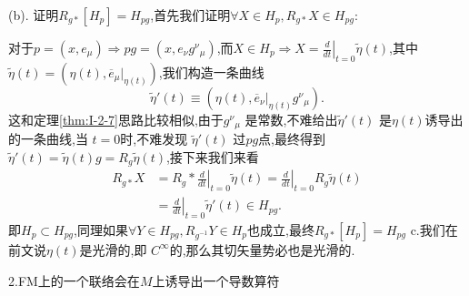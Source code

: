 \documentclass[../main.tex]{subfiles}
\begin{document}
{\color{red}(b).} 证明$R_{g*}[H_p] = H_{pg}$,首先我们证明$\forall X \in H_{p},R_{g*}X \in H_{pg}$:

对于$p = (x, e_\mu) \Rightarrow pg = (x, e_\nu g ^{\nu}{}_{\mu})$,而$X \in H_p \Rightarrow X = \left. \frac{d}{dt} \right|_{t = 0}\tilde{\eta}(t) $,其中$\tilde{\eta}(t) = (\eta(t),\overline{e}_\mu|_{\eta(t)})$,我们构造一条曲线\[\tilde{\eta}'(t)\equiv (\eta(t), \overline{e}_\nu|_{\eta(t)} g^{\nu}{}_{\mu}).\]
  这和定理\ref{thm:I-2-7}思路比较相似,由于$g^{\nu}{}_{\mu}$ 是常数,不难给出$\tilde{\eta}'(t)$ 是$\eta(t)$诱导出的一条曲线,当 $t = 0$时,不难发现 $\tilde{\eta}'(t)$ 过$pg$点,最终得到$\tilde{\eta}'(t) = \tilde{\eta}(t)g = R_g \tilde{\eta}(t)$,接下来我们来看
  \begin{align*}
    R_{g*} X &= R_g{*} \left. \frac{d}{dt} \right|_{t = 0}\tilde{\eta}(t) =  \left. \frac{d}{dt} \right|_{t = 0}R_g\tilde{\eta}(t)\\
             & = \left. \frac{d}{dt} \right|_{t = 0} \tilde{\eta}'(t) \in H_{pg} 
  .\end{align*}
即$H_p \subset H_{pg}$,同理如果$\forall Y \in H_{pg},R_{g^{-1}} Y \in H_p$也成立,最终$R_{g*}[H_p] = H_{pg}$
{\color{red}c.}我们在前文说$\eta(t)$是光滑的,即 $C^\infty$的,那么其切矢量势必也是光滑的.

2.FM上的一个联络会在$M$上诱导出一个导数算符
\end{document}
